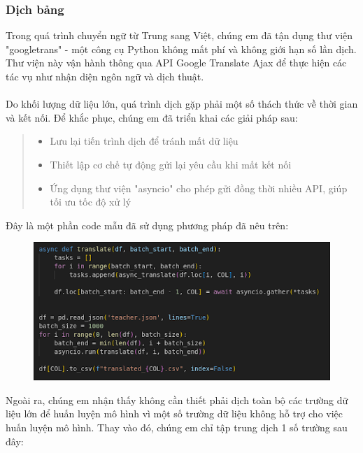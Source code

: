 \subsubsection{Dịch bảng}
Trong quá trình chuyển ngữ từ Trung sang Việt, chúng em đã tận dụng thư viện "googletrans" - một công cụ Python không mất phí và không giới hạn số lần dịch. Thư viện này vận hành thông qua API Google Translate Ajax để thực hiện các tác vụ như nhận diện ngôn ngữ và dịch thuật.\\
\\
Do khối lượng dữ liệu lớn, quá trình dịch gặp phải một số thách thức về thời gian và kết nối. Để khắc phục, chúng em đã triển khai các giải pháp sau:
\begin{quote}
\begin{itemize}
    \item Lưu lại tiến trình dịch để tránh mất dữ liệu
    \item Thiết lập cơ chế tự động gửi lại yêu cầu khi mất kết nối
    \item Ứng dụng thư viện "asyncio" cho phép gửi đồng thời nhiều API, giúp tối ưu tốc độ xử lý
\end{itemize}
\end{quote}
Đây là một phần code mẫu đã sử dụng phương pháp đã nêu trên:\\
\begin{figure}[h]
    \centering
    \includegraphics[width=0.75\linewidth]{figures/1.png}
\end{figure}
\newpage
Ngoài ra, chúng em nhận thấy không cần thiết phải dịch toàn bộ các trường dữ liệu lớn để huấn luyện mô hình vì một số trường dữ liệu không hỗ trợ cho việc huấn luyện mô hình. Thay vào đó, chúng em chỉ tập trung dịch 1 số trường sau đây:
